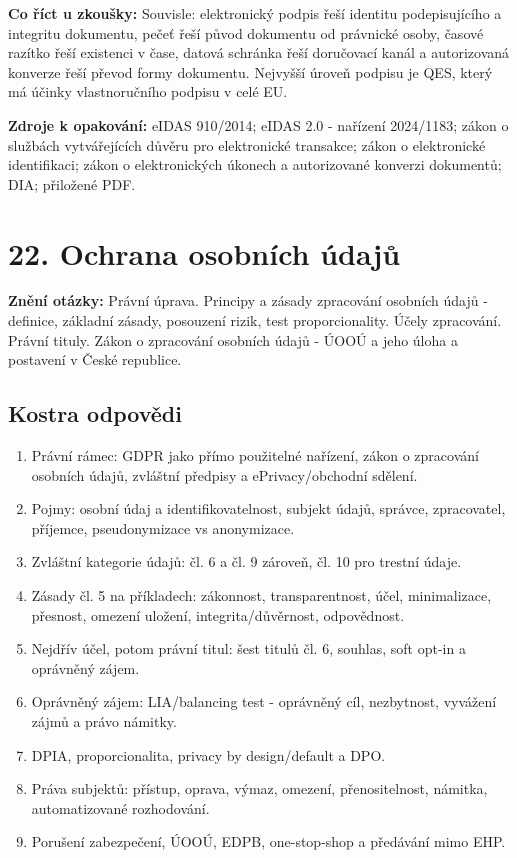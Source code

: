 \documentclass[11pt,a4paper]{article}
\newcommand{\otazka}[3]{\section*{#1}\addcontentsline{toc}{section}{#1}\noindent\textbf{Znění otázky:} #2\par\medskip}
\newcommand{\zkouska}[1]{\begin{tcolorbox}[breakable,enhanced,colback=blue!7,colframe=blue!30!black,boxrule=0pt,arc=1mm,left=5pt,right=5pt,top=5pt,bottom=5pt,before skip=6pt,after skip=6pt]\textbf{Co říct u zkoušky:} #1\end{tcolorbox}}
\newcommand{\zdroje}[1]{\medskip\noindent\textbf{Zdroje k opakování:} #1\medskip}
\begin{document}
\zkouska{Souvisle: elektronický podpis řeší identitu podepisujícího a integritu dokumentu, pečeť řeší původ dokumentu od právnické osoby, časové razítko řeší existenci v čase, datová schránka řeší doručovací kanál a autorizovaná konverze řeší převod formy dokumentu. Nejvyšší úroveň podpisu je QES, který má účinky vlastnoručního podpisu v celé EU.}

\zdroje{eIDAS 910/2014; eIDAS 2.0 - nařízení 2024/1183; zákon o službách vytvářejících důvěru pro elektronické transakce; zákon o elektronické identifikaci; zákon o elektronických úkonech a autorizované konverzi dokumentů; DIA; přiložené PDF.}

\iffalse

\otazka{22. Ochrana osobních údajů}{Právní úprava. Principy a zásady zpracování osobních údajů - definice, základní zásady, posouzení rizik, test proporcionality. Účely zpracování. Právní tituly. Zákon o zpracování osobních údajů - ÚOOÚ a jeho úloha a postavení v České republice.}{BI301K}

\subsection*{Kostra odpovědi}
\begin{enumerate}
  \item Právní rámec: GDPR jako přímo použitelné nařízení, zákon o zpracování osobních údajů, zvláštní předpisy a ePrivacy/obchodní sdělení.
  \item Pojmy: osobní údaj a identifikovatelnost, subjekt údajů, správce, zpracovatel, příjemce, pseudonymizace vs anonymizace.
  \item Zvláštní kategorie údajů: čl. 6 a čl. 9 zároveň, čl. 10 pro trestní údaje.
  \item Zásady čl. 5 na příkladech: zákonnost, transparentnost, účel, minimalizace, přesnost, omezení uložení, integrita/důvěrnost, odpovědnost.
  \item Nejdřív účel, potom právní titul: šest titulů čl. 6, souhlas, soft opt-in a oprávněný zájem.
  \item Oprávněný zájem: LIA/balancing test - oprávněný cíl, nezbytnost, vyvážení zájmů a právo námitky.
  \item DPIA, proporcionalita, privacy by design/default a DPO.
  \item Práva subjektů: přístup, oprava, výmaz, omezení, přenositelnost, námitka, automatizované rozhodování.
  \item Porušení zabezpečení, ÚOOÚ, EDPB, one-stop-shop a předávání mimo EHP.
\end{enumerate}
\end{document}
